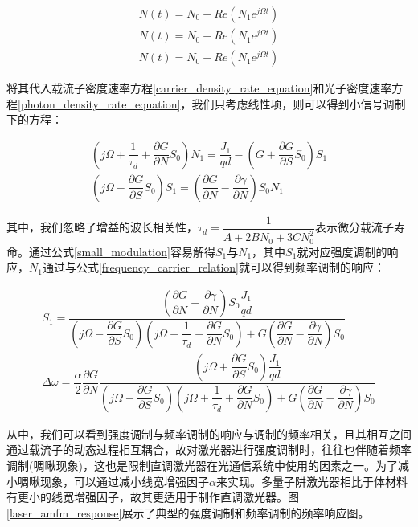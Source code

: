 \begin{equation}
\label{current_modulation}
\begin{array}{l}
N(t) = N_{0}+ Re(N_{1}e^{j\Omega t})\\
N(t) = N_{0}+ Re(N_{1}e^{j\Omega t})\\
N(t) = N_{0}+ Re(N_{1}e^{j\Omega t})
\end{array}
\end{equation}

将其代入载流子密度速率方程\ref{carrier_density_rate_equation}和光子密度速率方程\ref{photon_density_rate_equation}，我们只考虑线性项，则可以得到小信号调制下的方程：

\begin{equation}
\label{small_modulation}
\begin{array}{l}
(j\Omega + \dfrac{1}{\tau_{d}} + \dfrac{\partial G}{\partial N}S_{0})N_{1} = \dfrac{J_{1}}{qd} - (G+\dfrac{\partial G}{\partial S}S_{0})S_{1}\\
(j\Omega - \dfrac{\partial G}{\partial S}S_{0})S_{1} = (\dfrac{\partial G}{\partial N}-\dfrac{\partial \gamma}{\partial N})S_{0}N_{1}
\end{array}
\end{equation}

其中，我们忽略了增益的波长相关性，$\tau_{d} = \dfrac{1}{A+2BN_0 +3CN_0^2}$表示微分载流子寿命。通过公式\ref{small_modulation}容易解得$S_{1}$与$N_{1}$，其中$S_{1}$就对应强度调制的响应，$N_{1}$通过与公式\ref{frequency_carrier_relation}就可以得到频率调制的响应：

\begin{equation}
\label{am_fm}
\begin{array}{l}
S_{1} = \dfrac{(\dfrac{\partial G}{\partial N}-\dfrac{\partial\gamma}{\partial N})S_{0}\dfrac{J_{1}}{qd}}{(j\Omega-\dfrac{\partial G}{\partial S}S_{0})(j\Omega+\dfrac{1}{\tau_{d}}+\dfrac{\partial G}{\partial N}S_{0})+G(\dfrac{\partial G}{\partial N}-\dfrac{\partial\gamma}{\partial N})S_{0}}\\
\Delta\omega = \dfrac{\alpha}{2}\dfrac{\partial G}{\partial N}\dfrac{(j\Omega+\dfrac{\partial G}{\partial S}S_{0})\dfrac{J_{1}}{qd}}{(j\Omega-\dfrac{\partial G}{\partial S}S_{0})(j\Omega+\dfrac{1}{\tau_{d}}+\dfrac{\partial G}{\partial N}S_{0})+G(\dfrac{\partial G}{\partial N}-\dfrac{\partial\gamma}{\partial N})S_{0}}
\end{array}
\end{equation}

从中，我们可以看到强度调制与频率调制的响应与调制的频率相关，且其相互之间通过载流子的动态过程相互耦合，故对激光器进行强度调制时，往往也伴随着频率调制(啁啾现象)，这也是限制直调激光器在光通信系统中使用的因素之一。为了减小啁啾现象，可以通过减小线宽增强因子$\alpha$来实现。多量子阱激光器相比于体材料有更小的线宽增强因子，故其更适用于制作直调激光器。图\ref{laser_amfm_response}展示了典型的强度调制和频率调制的频率响应图。

